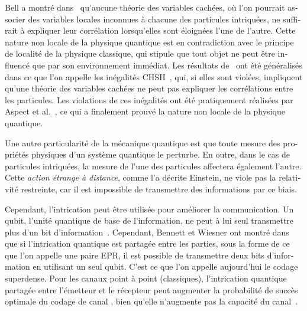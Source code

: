 \begin{otherlanguage}{french}
Bell a montré dans~\cite{Bell64} qu'aucune théorie des variables cachées, où l'on pourrait associer des variables locales inconnues à chacune des particules intriquées, ne suffirait à expliquer leur corrélation lorsqu'elles sont éloignées l'une de l'autre. Cette nature non locale de la physique quantique est en contradiction avec le principe de localité de la physique classique, qui stipule que tout objet ne peut être influencé que par son environnement immédiat. Les résultats de~\cite{Bell64} ont été généralisés dans ce que l'on appelle les inégalités CHSH~\cite{CHSH69}, qui, si elles sont violées, impliquent qu'une théorie des variables cachées ne peut pas expliquer les corrélations entre les particules. Les violations de ces inégalités ont été pratiquement réalisées par Aspect et al.~\cite{ADG82}, ce qui a finalement prouvé la nature non locale de la physique quantique.

Une autre particularité de la mécanique quantique est que toute mesure des propriétés physiques d'un système quantique le perturbe. En outre, dans le cas de particules intriquées, la mesure de l'une des particules affectera également l'autre. Cette \emph{action étrange à distance}, comme l'a décrite Einstein, ne viole pas la relativité restreinte, car il est impossible de transmettre des informations par ce biais.

Cependant, l'intrication peut être utilisée pour améliorer la communication. Un qubit, l'unité quantique de base de l'information, ne peut à lui seul transmettre plus d'un bit d'information~\cite{Holevo73}. Cependant, Bennett et Wiesner ont montré dans~\cite{BW92} que si l'intrication quantique est partagée entre les parties, sous la forme de ce que l'on appelle une paire EPR, il est possible de transmettre deux bits d'information en utilisant un seul qubit. C'est ce que l'on appelle aujourd'hui le codage superdense. Pour les canaux point à point (classiques), l'intrication quantique partagée entre l'émetteur et le récepteur peut augmenter la probabilité de succès optimale du codage de canal \cite{CLMW10,PLMKR11}, bien qu'elle n'augmente pas la capacité du canal~\cite{BBCJPW93,BSST99}.


\end{otherlanguage}
